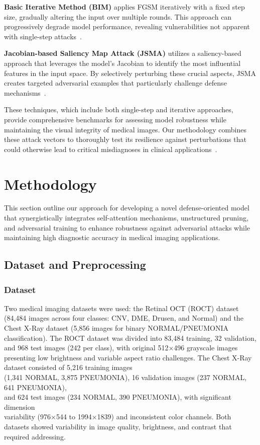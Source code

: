 \documentclass[preprint,12pt]{elsarticle}
\begin{document}
\textbf{Basic Iterative Method (BIM)} applies FGSM iteratively with a fixed step size, gradually altering the input over multiple rounds. This approach can progressively degrade model performance, revealing vulnerabilities not apparent with single-step attacks~\cite{Li22}.

\textbf{Jacobian-based Saliency Map Attack (JSMA)} utilizes a saliency-based approach that leverages the model's Jacobian to identify the most influential features in the input space. By selectively perturbing these crucial aspects, JSMA creates targeted adversarial examples that particularly challenge defense mechanisms~\cite{Yu24}.

These techniques, which include both single-step and iterative approaches, provide comprehensive benchmarks for assessing model robustness while maintaining the visual integrity of medical images. Our methodology combines these attack vectors to thoroughly test its resilience against perturbations that could otherwise lead to critical misdiagnoses in clinical applications~\cite{Wang22, Esmaeili23}.

\section{Methodology}
\label{sec:methodology}

This section outline our approach for developing a novel defense-oriented model that synergistically integrates self-attention mechanisms, unstructured pruning, and adversarial training to enhance robustness against adversarial attacks while maintaining high diagnostic accuracy in medical imaging applications.

\subsection{Dataset and Preprocessing}

\subsubsection{Dataset}
Two medical imaging datasets were used: the Retinal OCT (ROCT) dataset (84,484 images across four classes: CNV, DME, Drusen, and Normal) and the Chest X-Ray dataset (5,856 images for binary NORMAL/PNEUMONIA classification). The ROCT dataset was divided into 83,484 training, 32 validation, and 968 test images (242 per class), with original 512×496 grayscale images presenting low brightness and variable aspect ratio challenges. The Chest X-Ray dataset consisted of 5,216 training images \\
(1,341 NORMAL, 3,875 PNEUMONIA), 16 validation images (237 NORMAL, 641 PNEUMONIA), \\
and 624 test images (234 NORMAL, 390 PNEUMONIA), with significant dimension \\
variability (976×544 to 1994×1839) and inconsistent color channels. Both datasets showed variability in image quality, brightness, and contrast that required addressing.
\end{document}

